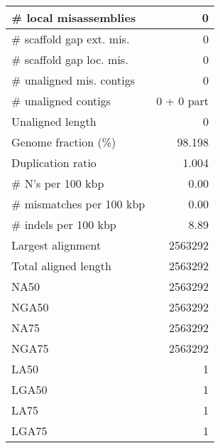 \documentclass[12pt,a4paper]{article}
\begin{document}
\begin{table}[ht]
\begin{center}
\begin{tabular}{|l*{1}{|r}|}
\# local misassemblies & 0 \\ \hline
\# scaffold gap ext. mis. & 0 \\ \hline
\# scaffold gap loc. mis. & 0 \\ \hline
\# unaligned mis. contigs & 0 \\ \hline
\# unaligned contigs & 0 + 0 part \\ \hline
Unaligned length & 0 \\ \hline
Genome fraction (\%) & 98.198 \\ \hline
Duplication ratio & 1.004 \\ \hline
\# N's per 100 kbp & 0.00 \\ \hline
\# mismatches per 100 kbp & 0.00 \\ \hline
\# indels per 100 kbp & 8.89 \\ \hline
Largest alignment & 2563292 \\ \hline
Total aligned length & 2563292 \\ \hline
NA50 & 2563292 \\ \hline
NGA50 & 2563292 \\ \hline
NA75 & 2563292 \\ \hline
NGA75 & 2563292 \\ \hline
LA50 & 1 \\ \hline
LGA50 & 1 \\ \hline
LA75 & 1 \\ \hline
LGA75 & 1 \\ \hline
\end{tabular}
\end{center}
\end{table}
\end{document}
